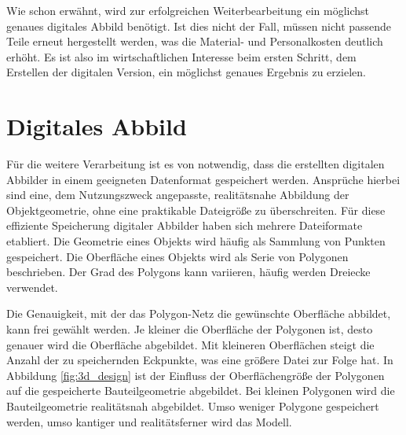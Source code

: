 Wie schon erwähnt, wird zur erfolgreichen Weiterbearbeitung ein möglichst 
genaues digitales Abbild benötigt.
Ist dies nicht der Fall, müssen nicht passende Teile erneut hergestellt werden, 
was die Material- und Personalkosten deutlich erhöht. Es ist also im 
wirtschaftlichen Interesse beim ersten Schritt, dem Erstellen der digitalen 
Version, ein möglichst genaues Ergebnis zu erzielen. 

\section{Digitales Abbild}

Für die weitere Verarbeitung ist es von notwendig, dass die erstellten digitalen 
Abbilder in einem geeigneten Datenformat gespeichert werden. Ansprüche hierbei sind 
eine, dem Nutzungszweck angepasste, realitätsnahe Abbildung der Objektgeometrie, 
ohne eine praktikable Dateigröße zu überschreiten.
Für diese effiziente Speicherung digitaler Abbilder haben sich mehrere
Dateiformate etabliert.
Die Geometrie eines Objekts wird häufig als Sammlung von Punkten 
gespeichert. Die Oberfläche eines Objekts wird als Serie von Polygonen beschrieben. 
Der Grad des Polygons kann variieren, häufig werden Dreiecke verwendet. \cite{lee2019study}

Die Genauigkeit, mit der das Polygon-Netz die gewünschte Oberfläche 
abbildet, kann frei gewählt werden. 
Je kleiner die Oberfläche der Polygonen ist, desto genauer wird die Oberfläche 
abgebildet. Mit kleineren Oberflächen steigt die Anzahl der zu speichernden 
Eckpunkte, was eine größere Datei zur Folge hat.
In Abbildung \ref{fig:3d_design} ist der Einfluss der Oberflächengröße der Polygonen
auf die gespeicherte Bauteilgeometrie abgebildet. Bei kleinen Polygonen 
wird die Bauteilgeometrie realitätsnah abgebildet. Umso weniger Polygone gespeichert 
werden, umso kantiger und realitätsferner wird das Modell.

